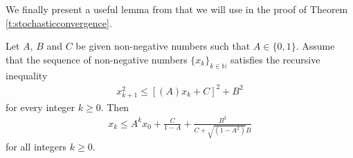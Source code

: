 We finally present a useful lemma from \citep{dalalyan2017user} that we will use in the proof of Theorem \ref{t:stochasticconvergence}.

\begin{lemma}\citep[Lemma 7 in][]{dalalyan2017user} \label{l:dalalyanuseful} Let $A$, $B$ and $C$ be given non-negative numbers such that $A \in \{0,1\}$. Assume that the sequence of non-negative numbers $\{x_k\}_{k \in \mathbb{N}}$ satisfies the recursive inequality
\begin{align*}
x_{k+1}^2 \le \left[(A)x_k + C\right]^2 + B^2
\end{align*}
for every integer $k \ge 0$. Then
\begin{align}
x_k \le A^{k}x_0 + \frac{C}{1-A} + \frac{B^2}{C + \sqrt{(1-A^2)}B}
\end{align}
for all integers $k \ge 0$.

\end{lemma}
